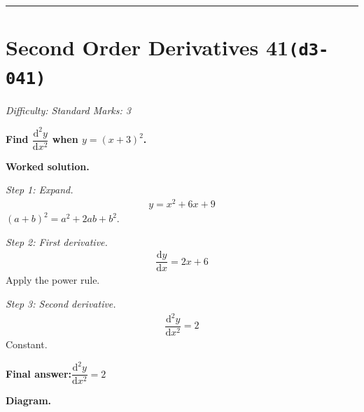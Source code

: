 \documentclass[11pt]{article}
\newcommand{\question}[1]{\par\medskip\noindent\textbf{#1}\par}
\begin{document}
\medskip\hrule

\section*{Second Order Derivatives 41\quad\small\texttt{(d3-041)}}
\textit{Difficulty: Standard \quad\textbar\quad Marks: 3}

\question{Find \( \dfrac{\mathrm{d}^2y}{\mathrm{d}x^2} \) when \( y = (x + 3)^2 \).}

\textbf{Worked solution.}

\textit{Step 1: Expand.}
\[\begin{gathered}
y = x^2 + 6x + 9
\end{gathered}\]
\( (a+b)^2 = a^2 + 2ab + b^2 \).

\textit{Step 2: First derivative.}
\[\begin{gathered}
\dfrac{\mathrm{d}y}{\mathrm{d}x} = 2x + 6
\end{gathered}\]
Apply the power rule.

\textit{Step 3: Second derivative.}
\[\begin{gathered}
\dfrac{\mathrm{d}^2y}{\mathrm{d}x^2} = 2
\end{gathered}\]
Constant.

\begin{answerbox}
\textbf{Final answer:}\quad \(\displaystyle  \dfrac{\mathrm{d}^2y}{\mathrm{d}x^2} = 2 \)
\end{answerbox}
\textbf{Diagram.}
\end{document}
